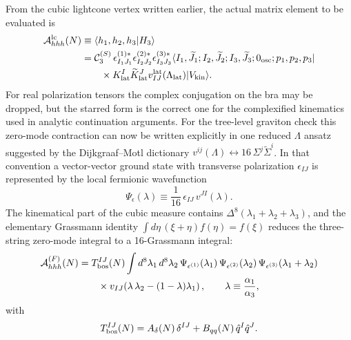 \documentclass[11pt]{article}
\numberwithin{equation}{section}
\begin{document}
From the cubic lightcone vertex written earlier, the actual matrix element to be evaluated is
\begin{equation}
\label{eq:s15-1-009}
\begin{aligned}
{\cal A}_{hhh}^{\mathrm{lc}}(N)
&\equiv
\langle h_1,h_2,h_3|H_3\rangle \\
&=
{\cal C}_3^{(S)}\,
\epsilon_{I_1J_1}^{(1)*}\epsilon_{I_2J_2}^{(2)*}\epsilon_{I_3J_3}^{(3)*}
\langle I_1,\widetilde J_1;I_2,\widetilde J_2;I_3,\widetilde J_3;
0_{\mathrm{osc}};p_1,p_2,p_3| \\
&\qquad\times
K^I_{\mathrm{lat}}\widetilde K^J_{\mathrm{lat}}
v^{\mathrm{lat}}_{IJ}(\Lambda_{\mathrm{lat}})
|V_{\mathrm{kin}}\rangle .
\end{aligned}
\end{equation}
For real polarization tensors the complex conjugation on the bra may be dropped, but the starred form is the correct one for the complexified kinematics used in analytic continuation arguments.
For the tree-level graviton check this zero-mode contraction can now be written explicitly in one reduced $\Lambda$ ansatz suggested by the Dijkgraaf--Motl dictionary
\(
v^{ij}(\Lambda)\leftrightarrow 16\,\Sigma^j\widetilde\Sigma^i
\).
In that convention a vector-vector ground state with transverse polarization $\epsilon_{IJ}$ is represented by the local fermionic wavefunction
\begin{equation}
\label{eq:s15-1-009a}
\Psi_\epsilon(\lambda)
\equiv
\frac1{16}\,\epsilon_{IJ}\,v^{JI}(\lambda).
\end{equation}
The kinematical part of the cubic measure contains
\(
\Delta^8(\lambda_1+\lambda_2+\lambda_3)
\),
and the elementary Grassmann identity
\(
\int d\eta\,(\xi+\eta)f(\eta)=f(\xi)
\)
reduces the three-string zero-mode integral to a 16-Grassmann integral:
\begin{equation}
\label{eq:s15-1-009b}
\begin{aligned}
{\cal A}^{(F)}_{hhh}(N)
&=
T_{\rm bos}^{IJ}(N)
\int d^8\lambda_1\,d^8\lambda_2\,
\Psi_{\epsilon^{(1)}}(\lambda_1)\,
\Psi_{\epsilon^{(2)}}(\lambda_2)\,
\Psi_{\epsilon^{(3)}}(\lambda_1+\lambda_2)
\\
&\qquad\times
v_{IJ}\!\left(\lambda\,\lambda_2-(1-\lambda)\lambda_1\right),
\qquad
\lambda\equiv \frac{\alpha_1}{\alpha_3},
\end{aligned}
\end{equation}
with
\begin{equation}
\label{eq:s15-1-009c}
T_{\rm bos}^{IJ}(N)=A_\delta(N)\,\delta^{IJ}+B_{qq}(N)\,\hat q^I\hat q^J.
\end{equation}
\end{document}
